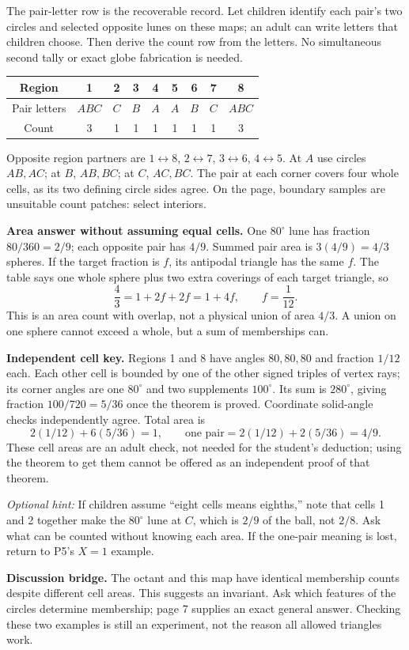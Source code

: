 \documentclass[11pt,letterpaper]{article}
\newcommand{\hint}[1]{\textit{Optional hint:} #1\par}
\newcommand{\degc}{^\circ}
\begin{document}
The pair-letter row is the recoverable record. Let children identify each pair's two circles and selected opposite lunes on these maps; an adult can write letters that children choose. Then derive the count row from the letters. No simultaneous second tally or exact globe fabrication is needed.

\begin{center}\begin{tabular}{c|cccccccc}
Region &1&2&3&4&5&6&7&8\\\hline
Pair letters & $ABC$&$C$&$B$&$A$&$A$&$B$&$C$&$ABC$\\
Count &3&1&1&1&1&1&1&3
\end{tabular}\end{center}
Opposite region partners are $1\leftrightarrow8$, $2\leftrightarrow7$, $3\leftrightarrow6$, $4\leftrightarrow5$. At $A$ use circles $AB,AC$; at $B$, $AB,BC$; at $C$, $AC,BC$. The pair at each corner covers four whole cells, as its two defining circle sides agree. On the page, boundary samples are unsuitable count patches: select interiors.

\textbf{Area answer without assuming equal cells.} One $80\degc$ lune has fraction $80/360=2/9$; each opposite pair has $4/9$. Summed pair area is $3(4/9)=4/3$ spheres. If the target fraction is $f$, its antipodal triangle has the same $f$. The table says one whole sphere plus two extra coverings of each target triangle, so
\[
 \frac43=1+2f+2f=1+4f,\qquad f=\frac1{12}.
\]
This is an area count with overlap, not a physical union of area $4/3$. A union on one sphere cannot exceed a whole, but a sum of memberships can.

\textbf{Independent cell key.} Regions 1 and 8 have angles $80,80,80$ and fraction $1/12$ each. Each other cell is bounded by one of the other signed triples of vertex rays; its corner angles are one $80\degc$ and two supplements $100\degc$. Its sum is $280\degc$, giving fraction $100/720=5/36$ once the theorem is proved. Coordinate solid-angle checks independently agree. Total area is
\[
 2(1/12)+6(5/36)=1,
 \qquad\text{one pair}=2(1/12)+2(5/36)=4/9.
\]
These cell areas are an adult check, not needed for the student's deduction; using the theorem to get them cannot be offered as an independent proof of that theorem.

\hint{If children assume ``eight cells means eighths,'' note that cells 1 and 2 together make the $80\degc$ lune at $C$, which is $2/9$ of the ball, not $2/8$. Ask what can be counted without knowing each area. If the one-pair meaning is lost, return to P5's $X=1$ example.}
\textbf{Discussion bridge.} The octant and this map have identical membership counts despite different cell areas. This suggests an invariant. Ask which features of the circles determine membership; page 7 supplies an exact general answer. Checking these two examples is still an experiment, not the reason all allowed triangles work.
\end{document}

